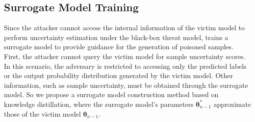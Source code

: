 
\subsection{Surrogate Model Training}
Since the attacker cannot access the internal information of the victim model to perform uncertainty estimation under the black-box threat model, \pandora trains a surrogate model to provide guidance for the generation of poisoned samples.
First, the attacker cannot query the victim model for sample uncertainty scores. 
In this scenario, the adversary is restricted to accessing only the predicted labels or the output probability distribution generated by the victim model.
Other information, such as sample uncertainty, must be obtained through the surrogate model.
So we propose a surrogate model construction method based on knowledge distillation, where the surrogate model’s parameters $\bm{\theta}_{n-1}^{*}$ approximate those of the victim model $\bm{\theta}_{n-1}$.

